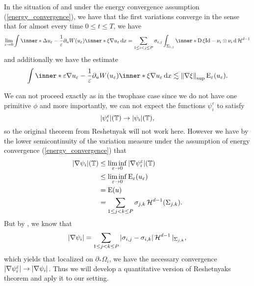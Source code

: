 \begin{proposition}
	In the situation of  and under the energy convergence assumption (\ref{energy_convergence}), we have that the first variations converge in the sense that for almost every time $ 0 \leq t \leq T $, we have
	\begin{equation*}
		\lim_{ \varepsilon \to 0 }
			\int
				\inner*{ 
					\Delta u_{ \varepsilon } - \frac{ 1 }{ \varepsilon } \partial_{ u } W ( u_{ \varepsilon } ) 
				}
				{ \inner*{ \xi }{ \nabla u_{ \varepsilon } } }
			\dd{ x }
		=
		\sum_{ 1 \leq i < j \leq P }
			\sigma_{ i , j }
			\int_{ \Sigma_{ i , j } }
				\inner*{ \diff \xi }{ \mathrm{Id} - \nu_{ i } \otimes \nu_{ i } }
			\dd{ \hm^{ d - 1} }
	\end{equation*}
	and additionally we have the estimate
	\begin{equation*}
		\int
		\inner*{ 
			\varepsilon \nabla u_{ \varepsilon } - \frac{ 1 }{ \varepsilon } 	\partial_{ u } W ( u_{ \varepsilon } ) 
		}
		{ \inner*{ \xi }{ \nabla u_{ \varepsilon } } }
		\dd{ x }
		\lesssim
		\norm{ \nabla \xi }_{ \sup }
		\energy_{ \varepsilon } ( u_{ \varepsilon } ).
	\end{equation*}
\end{proposition}

\begin{remark}
	We can not proceed exactly as in the twophase case since we do not have one primitive $ \phi $ and more importantly, we can not expect the functions $ \psi_{ i }^{ \varepsilon } $ to satisfy 
	\begin{equation}
		\label{energy_convergence_of_psi_i}
		\abs{ \psi_{ i }^{ \varepsilon } } ( \operatorname{\mathbb{T}} ) \to \abs{ \psi_{ i } } ( \operatorname{\mathbb{T}} ),
	\end{equation}
	so the original theorem from Reshetnyak will not work here. However we have by the lower semicontinuity of the variation measure under the assumption of energy convergence (\ref{energy_convergence}) that
	\begin{align*}
		\abs{ \nabla \psi_{ i } } ( \operatorname{\mathbb{T}} )
		&
		\leq
		\liminf_{ \varepsilon \to 0 }
			\abs{ \nabla \psi_{ i }^{ \varepsilon } } ( \operatorname{\mathbb{T}} )
		\\
		& \leq
		\liminf_{ \varepsilon \to 0 }
			\operatorname{E}_{ \varepsilon } ( u_{ \varepsilon } )
		\\
		& =
		\operatorname{E} ( u )
		\\
		& =
		\sum_{ 1 \leq j < k \leq P }
			\sigma_{ j , k }
			\operatorname{\mathcal{H}}^{ d -1 } ( \Sigma_{ j , k } ).
	\end{align*}
	But by , we know that
	\begin{equation*}
		\abs{ \nabla \psi_{ i } }
		=
		\sum_{ 1 \leq j < k \leq P }
			\abs{ \sigma_{ i , j } - \sigma_{ i , k } }
			\operatorname{\mathcal{H}}^{ d - 1 } |_{ \Sigma_{ j , k } },
	\end{equation*}
	which yields that localized on $ \partial_{ \ast } \Omega_{ i } $, we have the necessary convergence $ \abs{ \nabla \psi_{i }^{ \varepsilon } } \to \abs{ \nabla \psi_{ i } } $. Thus we will develop a quantitative version of Reshetnyaks theorem and aply it to our setting.
\end{remark}

